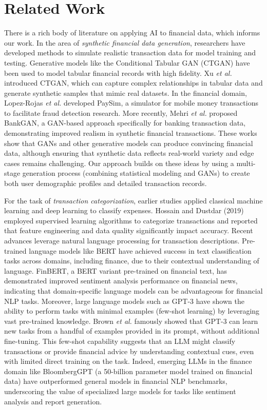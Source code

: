 \documentclass{scrartcl}
\begin{document}
\section{Related Work}
\label{sec:litreview}
There is a rich body of literature on applying AI to financial data, which informs our work. In the area of \textit{synthetic financial data generation}, researchers have developed methods to simulate realistic transaction data for model training and testing. Generative models like the Conditional Tabular GAN (CTGAN) have been used to model tabular financial records with high fidelity. Xu \textit{et al.} introduced CTGAN, which can capture complex relationships in tabular data and generate synthetic samples that mimic real datasets. In the financial domain, Lopez-Rojas \textit{et al.} developed PaySim, a simulator for mobile money transactions to facilitate fraud detection research. More recently, Mehri \textit{et al.} proposed BankGAN, a GAN-based approach specifically for banking transaction data, demonstrating improved realism in synthetic financial transactions. These works show that GANs and other generative models can produce convincing financial data, although ensuring that synthetic data reflects real-world variety and edge cases remains challenging. Our approach builds on these ideas by using a multi-stage generation process (combining statistical modeling and GANs) to create both user demographic profiles and detailed transaction records.

For the task of \textit{transaction categorization}, earlier studies applied classical machine learning and deep learning to classify expenses. Hossain and Dustdar (2019) employed supervised learning algorithms to categorize transactions and reported that feature engineering and data quality significantly impact accuracy. Recent advances leverage natural language processing for transaction descriptions. Pre-trained language models like BERT have achieved success in text classification tasks across domains, including finance, due to their contextual understanding of language. FinBERT, a BERT variant pre-trained on financial text, has demonstrated improved sentiment analysis performance on financial news, indicating that domain-specific language models can be advantageous for financial NLP tasks. Moreover, large language models such as GPT-3 have shown the ability to perform tasks with minimal examples (few-shot learning) by leveraging vast pre-trained knowledge. Brown \textit{et al.} famously showed that GPT-3 can learn new tasks from a handful of examples provided in its prompt, without additional fine-tuning. This few-shot capability suggests that an LLM might classify transactions or provide financial advice by understanding contextual cues, even with limited direct training on the task. Indeed, emerging LLMs in the finance domain like BloombergGPT (a 50-billion parameter model trained on financial data) have outperformed general models in financial NLP benchmarks, underscoring the value of specialized large models for tasks like sentiment analysis and report generation.
\end{document}
